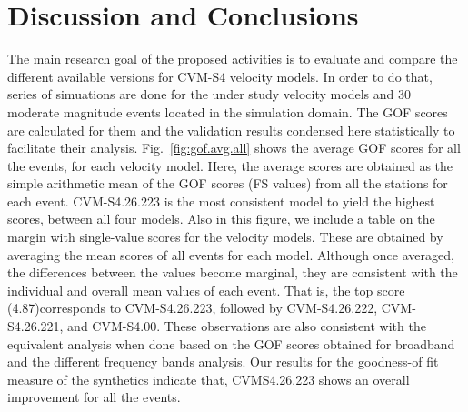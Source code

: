 
\section{Discussion and Conclusions}

The main research goal of the proposed activities is to evaluate and compare the different available versions for CVM-S4 velocity models. In order to do that, series of simuations are done for the under study velocity models and 30 moderate magnitude events located in the simulation domain. The GOF scores are calculated for them and the validation results condensed here statistically to facilitate their analysis. Fig.~\ref{fig:gof.avg.all} shows the average GOF scores for all the events, for each velocity model. Here, the average scores are obtained as the simple arithmetic mean of the GOF scores (FS values) from all the stations for each event. CVM-S4.26.223 is the most consistent model to yield the highest scores, between all four models. Also in this figure, we include a table on the margin with single-value scores for the velocity models. These are obtained by averaging the mean scores of all events for each model. Although once averaged, the differences between the values become marginal, they are consistent with the individual and overall mean values of each event. That is, the top score (4.87)corresponds to CVM-S4.26.223, followed by CVM-S4.26.222, CVM-S4.26.221, and CVM-S4.00. These observations are also consistent with the equivalent analysis when done based on the GOF scores obtained for broadband and the different frequency bands analysis. Our results for the goodness-of fit measure of the synthetics indicate that, CVMS4.26.223 shows an overall improvement for all the events.   


